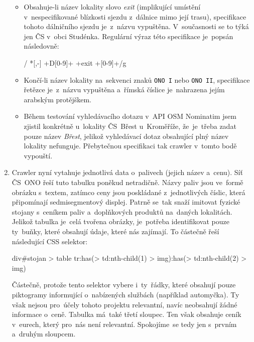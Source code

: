 \begin{enumerate}
        \begin{itemize}
            \item Obsahuje-li název lokality slovo \emph{exit}
                (implikující umístění v~nespecifikované blízkosti sjezdu
                z~dálnice mimo její trasu), specifikace tohoto dálničního
                sjezdu je~z~názvu vypuštěna. V~současnosti se to týká jen ČS
                v~obci Studénka. Regulární výraz této specifikace je~popsán
                následovně:
                
                \begin{tt}
                    \centering
                    / *[,-] +D[0-9]+ +exit +[0-9]+/g
                \end{tt}
            \item Končí-li název lokality na~sekvenci znaků \texttt{ONO I}
                nebo \texttt{ONO II}, specifikace řetězce je~z~názvu
                vypuštěna a~římská číslice je~nahrazena jejím arabským
                protějškem.
            \item Během testování vyhledávacího dotazu v~API OSM Nominatim
                jsem zjistil konkrétně u~lokality ČS~Břest u~Kroměříže,
                že~je~třeba zadat pouze název \emph{Břest}, jelikož
                vyhledávací dotaz obsahující plný název lokality nefunguje.
                Přebytečnou specifikaci tak crawler v~tomto bodě vypouští.
        \end{itemize}
    \item Crawler nyní vytahuje jednotlivá data o~palivech (jejich název
        a~cenu). Síť ČS~ONO řeší tuto tabulku poněkud netradičně. Názvy
        paliv jsou ve~formě obrázku s~textem, zatímco ceny jsou poskládané
        z~jednotlivých číslic, která připomínají sedmisegmentový displej.
        Patrně se~tak snaží imitovat fyzické stojany s~ceníkem paliv
        a~doplňkových produktů na~daných lokalitách. Jelikož tabulka je~celá
        tvořena obrázky, je~potřeba identifikovat pouze ty~buňky, které
        obsahují údaje, které nás zajímají. To částečně řeší následující
        CSS selektor:

        \begin{tt}
            \centering
            div\#stojan > table tr:has(> td:nth-child(1) > img):has(> td:nth-child(2) > img)
        \end{tt}

        Částečně, protože tento selektor vybere i~ty~řádky, které obsahují
        pouze piktogramy informující o~nabízených službách (například
        automyčka). Ty však nejsou pro~účely tohoto projektu relevantní,
        navíc neobsahují žádné informace o~ceně. Tabulka má~také třetí
        sloupec. Ten však obsahuje ceník v~eurech, který pro~nás není
        relevantní. Spokojíme~se tedy jen s~prvním a~druhým sloupcem.


\end{enumerate}
